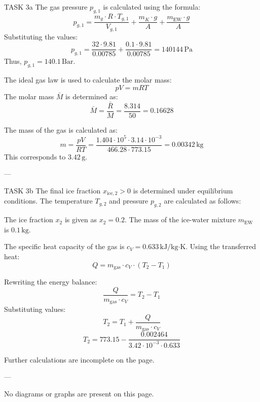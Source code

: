 TASK 3a  
The gas pressure \( p_{g,1} \) is calculated using the formula:  
\[
p_{g,1} = \frac{m_{g} \cdot R \cdot T_{g,1}}{V_{g,1}} + \frac{m_{K} \cdot g}{A} + \frac{m_{\text{EW}} \cdot g}{A}
\]  
Substituting the values:  
\[
p_{g,1} = \frac{32 \cdot 9.81}{0.00785} + \frac{0.1 \cdot 9.81}{0.00785} = 140144 \, \text{Pa}
\]  
Thus, \( p_{g,1} = 140.1 \, \text{Bar} \).  

The ideal gas law is used to calculate the molar mass:  
\[
pV = mRT
\]  
The molar mass \( \bar{M} \) is determined as:  
\[
\bar{M} = \frac{\bar{R}}{M} = \frac{8.314}{50} = 0.16628
\]  

The mass of the gas is calculated as:  
\[
m = \frac{pV}{RT} = \frac{1.404 \cdot 10^5 \cdot 3.14 \cdot 10^{-3}}{466.28 \cdot 773.15} = 0.00342 \, \text{kg}
\]  
This corresponds to \( 3.42 \, \text{g} \).  

---

TASK 3b  
The final ice fraction \( x_{\text{ice},2} > 0 \) is determined under equilibrium conditions. The temperature \( T_{g,2} \) and pressure \( p_{g,2} \) are calculated as follows:  

The ice fraction \( x_2 \) is given as \( x_2 = 0.2 \). The mass of the ice-water mixture \( m_{\text{EW}} \) is \( 0.1 \, \text{kg} \).  

The specific heat capacity of the gas is \( c_V = 0.633 \, \text{kJ/kg·K} \). Using the transferred heat:  
\[
Q = m_{\text{gas}} \cdot c_V \cdot (T_2 - T_1)
\]  

Rewriting the energy balance:  
\[
\frac{Q}{m_{\text{gas}} \cdot c_V} = T_2 - T_1
\]  
Substituting values:  
\[
T_2 = T_1 + \frac{Q}{m_{\text{gas}} \cdot c_V}
\]  
\[
T_2 = 773.15 - \frac{0.002464}{3.42 \cdot 10^{-3} \cdot 0.633}
\]  

Further calculations are incomplete on the page.  

---

No diagrams or graphs are present on this page.